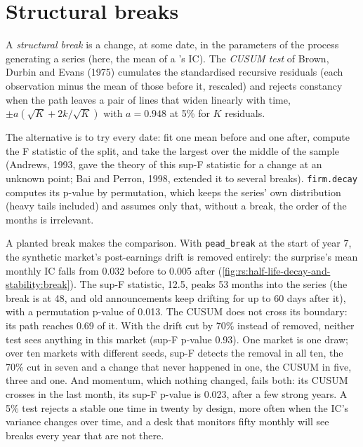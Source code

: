 \section{Structural breaks}

\begin{definition}\label{def:rs:half-life-decay-and-stability:break}
A \emph{structural break} is a change, at some date, in the parameters of the process generating a series (here,
the mean of a 's IC). The \emph{CUSUM test} of Brown, Durbin and Evans (1975) cumulates the standardised
recursive residuals (each observation minus the mean of those before it, rescaled) and rejects constancy when the path leaves a pair of
lines that widen linearly with time, $\pm a(\sqrt K + 2k/\sqrt K)$ with $a = 0.948$ at 5\% for $K$ residuals.
\end{definition}

The alternative is to try every date: fit one mean before and one after, compute the F statistic of the split, and take the largest over
the middle of the sample (Andrews, 1993, gave the theory of this sup-F statistic for a change at an unknown point; Bai and Perron, 1998,
extended it to several breaks). \texttt{firm.decay} computes its p-value by permutation, which keeps the series' own distribution (heavy
tails included) and assumes only that, without a break, the order of the months is irrelevant.

A planted break makes the comparison. With \texttt{pead\_break} at the start of year 7, the synthetic market's post-earnings drift is
removed entirely: the surprise's mean monthly IC falls from 0.032 before to 0.005 after (\cref{fig:rs:half-life-decay-and-stability:break}).
The sup-F statistic, 12.5, peaks 53 months into the series (the break is at 48, and old announcements keep drifting for up to 60 days after
it), with a permutation p-value of 0.013. The CUSUM does not cross its boundary: its path reaches 0.69 of it. With the drift cut by 70\% instead of removed, neither test sees anything in this market (sup-F p-value 0.93).
One market is one draw; over ten markets with different seeds, sup-F detects the removal in all ten, the 70\% cut in seven and a change that
never happened in one, the CUSUM in five, three and one. And momentum, which nothing changed, fails both: its CUSUM crosses in
the last month, its sup-F p-value is 0.023, after a few strong years. A 5\% test rejects a stable  one time in twenty by design,
more often when the IC's variance changes over time, and a desk that monitors fifty  monthly will see breaks every year that are
not there.


